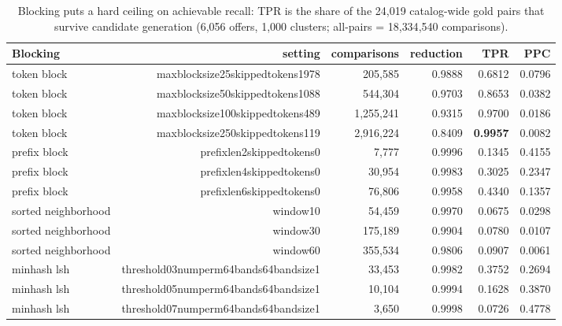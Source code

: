 \begin{table}[t]
\centering
\caption{Blocking puts a hard ceiling on achievable recall: TPR is the share of the 24{,}019 catalog-wide gold pairs that survive candidate generation (6{,}056 offers, 1{,}000 clusters; all-pairs = 18{,}334{,}540 comparisons).}
\label{tab:blocking}
\small
\begin{tabular}{lrrrrr}
\toprule
Blocking & setting & comparisons & reduction & TPR & PPC \\
\midrule
token block & maxblocksize25skippedtokens1978 & 205,585 & 0.9888 & 0.6812 & 0.0796 \\
token block & maxblocksize50skippedtokens1088 & 544,304 & 0.9703 & 0.8653 & 0.0382 \\
token block & maxblocksize100skippedtokens489 & 1,255,241 & 0.9315 & 0.9700 & 0.0186 \\
token block & maxblocksize250skippedtokens119 & 2,916,224 & 0.8409 & \textbf{0.9957} & 0.0082 \\
prefix block & prefixlen2skippedtokens0 & 7,777 & 0.9996 & 0.1345 & 0.4155 \\
prefix block & prefixlen4skippedtokens0 & 30,954 & 0.9983 & 0.3025 & 0.2347 \\
prefix block & prefixlen6skippedtokens0 & 76,806 & 0.9958 & 0.4340 & 0.1357 \\
sorted neighborhood & window10 & 54,459 & 0.9970 & 0.0675 & 0.0298 \\
sorted neighborhood & window30 & 175,189 & 0.9904 & 0.0780 & 0.0107 \\
sorted neighborhood & window60 & 355,534 & 0.9806 & 0.0907 & 0.0061 \\
minhash lsh & threshold03numperm64bands64bandsize1 & 33,453 & 0.9982 & 0.3752 & 0.2694 \\
minhash lsh & threshold05numperm64bands64bandsize1 & 10,104 & 0.9994 & 0.1628 & 0.3870 \\
minhash lsh & threshold07numperm64bands64bandsize1 & 3,650 & 0.9998 & 0.0726 & 0.4778 \\
\bottomrule
\end{tabular}
\end{table}
